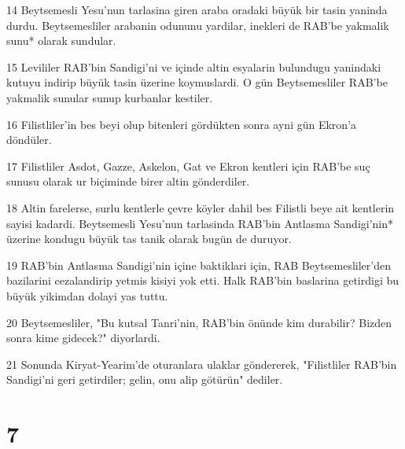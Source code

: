 \par 14 Beytsemesli Yesu'nun tarlasina giren araba oradaki büyük bir tasin yaninda durdu. Beytsemesliler arabanin odununu yardilar, inekleri de RAB'be yakmalik sunu* olarak sundular.
\par 15 Levililer RAB'bin Sandigi'ni ve içinde altin esyalarin bulundugu yanindaki kutuyu indirip büyük tasin üzerine koymuslardi. O gün Beytsemesliler RAB'be yakmalik sunular sunup kurbanlar kestiler.
\par 16 Filistliler'in bes beyi olup bitenleri gördükten sonra ayni gün Ekron'a döndüler.
\par 17 Filistliler Asdot, Gazze, Askelon, Gat ve Ekron kentleri için RAB'be suç sunusu olarak ur biçiminde birer altin gönderdiler.
\par 18 Altin farelerse, surlu kentlerle çevre köyler dahil bes Filistli beye ait kentlerin sayisi kadardi. Beytsemesli Yesu'nun tarlasinda RAB'bin Antlasma Sandigi'nin* üzerine kondugu büyük tas tanik olarak bugün de duruyor.
\par 19 RAB'bin Antlasma Sandigi'nin içine baktiklari için, RAB Beytsemesliler'den bazilarini cezalandirip yetmis kisiyi yok etti. Halk RAB'bin baslarina getirdigi bu büyük yikimdan dolayi yas tuttu.
\par 20 Beytsemesliler, "Bu kutsal Tanri'nin, RAB'bin önünde kim durabilir? Bizden sonra kime gidecek?" diyorlardi.
\par 21 Sonunda Kiryat-Yearim'de oturanlara ulaklar göndererek, "Filistliler RAB'bin Sandigi'ni geri getirdiler; gelin, onu alip götürün" dediler.

\chapter{7}

